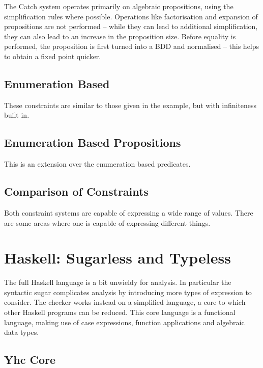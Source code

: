 \documentclass[preprint]{sigplanconf}
\begin{document}
The Catch system operates primarily on algebraic propositions, using the simplification rules where possible. Operations like factorisation and expansion of propositions are not performed -- while they can lead to additional simplification, they can also lead to an increase in the proposition size. Before equality is performed, the proposition is first turned into a BDD and normalised -- this helps to obtain a fixed point quicker.

\subsection{Enumeration Based}

These constraints are similar to those given in the example, but with infiniteness built in.

\subsection{Enumeration Based Propositions}

This is an extension over the enumeration based predicates.

\subsection{Comparison of Constraints}

Both constraint systems are capable of expressing a wide range of values. There are some areas where one is capable of expressing different things.





\section{Haskell: Sugarless and Typeless}
\label{sec:transform}

The full Haskell language is a bit unwieldy for analysis. In particular the
syntactic sugar complicates analysis by introducing more types of expression to
consider. The checker works instead on a simplified language, a core to which
other Haskell programs can be reduced. This core language is a functional
language, making use of case expressions, function applications and algebraic
data types.

\subsection{Yhc Core}
\end{document}

